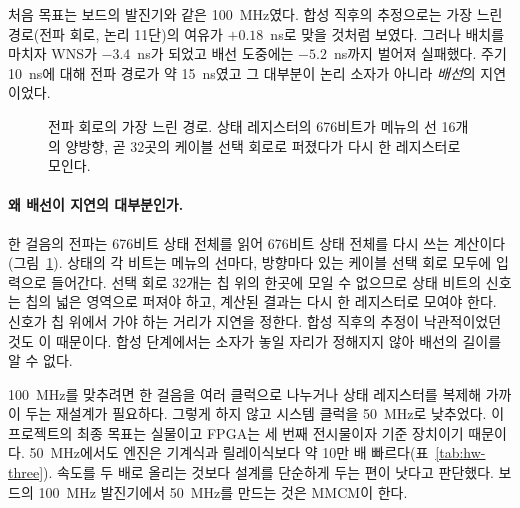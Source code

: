 처음 목표는 보드의 발진기와 같은 100~MHz였다. 합성 직후의 추정으로는 가장 느린 경로(전파 회로, 논리 11단)의
여유가 $+0.18$~ns로 맞을 것처럼 보였다. 그러나 배치를 마치자 WNS가 $-3.4$~ns가 되었고 배선 도중에는
$-5.2$~ns까지 벌어져 실패했다. 주기 10~ns에 대해 전파 경로가 약 15~ns였고 그 대부분이 논리 소자가 아니라
\emph{배선}의 지연이었다.

\begin{figure}[ht]
\centering
{}
\caption{전파 회로의 가장 느린 경로. 상태 레지스터의 676비트가 메뉴의 선 16개의 양방향, 곧 32곳의 케이블 선택
회로로 퍼졌다가 다시 한 레지스터로 모인다.}
\label{fig:fpga-fanout}
\end{figure}

\paragraph{왜 배선이 지연의 대부분인가.} 한 걸음의 전파는 676비트 상태 전체를 읽어 676비트 상태 전체를 다시
쓰는 계산이다(그림~\ref{fig:fpga-fanout}). 상태의 각 비트는 메뉴의 선마다, 방향마다 있는 케이블 선택 회로
모두에 입력으로 들어간다. 선택 회로 32개는 칩 위의 한곳에 모일 수 없으므로 상태 비트의 신호는 칩의 넓은
영역으로 퍼져야 하고, 계산된 결과는 다시 한 레지스터로 모여야 한다. 신호가 칩 위에서 가야 하는 거리가 지연을
정한다. 합성 직후의 추정이 낙관적이었던 것도 이 때문이다. 합성 단계에서는 소자가 놓일 자리가 정해지지 않아
배선의 길이를 알 수 없다.

100~MHz를 맞추려면 한 걸음을 여러 클럭으로 나누거나 상태 레지스터를 복제해 가까이 두는 재설계가 필요하다.
그렇게 하지 않고 시스템 클럭을 50~MHz로 낮추었다. 이 프로젝트의 최종 목표는 실물이고 FPGA는 세 번째 전시물이자
기준 장치이기 때문이다. 50~MHz에서도 엔진은 기계식과 릴레이식보다 약 10만 배 빠르다(표~\ref{tab:hw-three}).
속도를 두 배로 올리는 것보다 설계를 단순하게 두는 편이 낫다고 판단했다. 보드의 100~MHz 발진기에서 50~MHz를
만드는 것은 MMCM이 한다.

